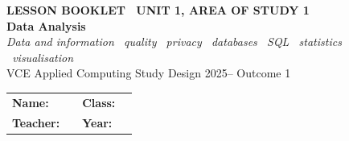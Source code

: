 \documentclass[11pt,a4paper]{article}
\begin{document}
\setlength{\parindent}{0pt}
\setlength{\parskip}{4pt}

\thispagestyle{plain}

\begin{tcolorbox}[
  enhanced, breakable=false, arc=4mm,
  colback=NavyBlue, colframe=NavyBlue,
  left=6mm, right=6mm, top=9mm, bottom=9mm,
  boxrule=0pt
]
  \begin{center}
    {\headingfont\bfseries\color{Sky}\footnotesize\MakeUppercase{Lesson Booklet \textbullet\ Unit 1, Area of Study 1}}\\[10pt]
    {\headingfont\bfseries\color{white}\fontsize{38}{42}\selectfont Data Analysis}\\[8pt]
    {\large\color{white!85!NavyBlue}\itshape Data and information \textbullet\ quality \textbullet\ privacy \textbullet\ databases \textbullet\ SQL \textbullet\ statistics \textbullet\ visualisation}\\[14pt]
    {\headingfont\color{white!72!NavyBlue}\normalsize VCE Applied Computing \textbar{} Study Design 2025-- \textbar{} Outcome 1}
  \end{center}
\end{tcolorbox}

\vspace{10pt}

\begin{tabular}{@{}p{3.5cm} p{6cm} p{2cm} p{3.5cm}@{}}
  \textbf{Name:}    & \underline{\hspace{5.8cm}} & \textbf{Class:}   & \underline{\hspace{3.3cm}} \\[8pt]
  \textbf{Teacher:} & \underline{\hspace{5.8cm}} & \textbf{Year:} & \underline{\hspace{3.3cm}} \\
\end{tabular}

\vspace{10pt}
\end{document}
